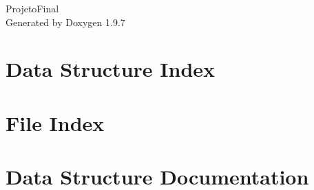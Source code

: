 \documentclass[twoside]{book}
\newcommand{\+}{\discretionary{\mbox{\scriptsize$\hookleftarrow$}}{}{}}
\newcommand{\clearemptydoublepage}{%
    \newpage{\pagestyle{empty}\cleardoublepage}%
  }
\begin{document}
  \raggedbottom
    \hypersetup{pageanchor=false,
                bookmarksnumbered=true,
                pdfencoding=unicode
               }
  \begin{titlepage}
  \vspace*{7cm}
  \begin{center}%
  {\Large Projeto\+Final}\\
  \vspace*{1cm}
  {\large Generated by Doxygen 1.9.7}\\
  \end{center}
  \end{titlepage}
  \clearemptydoublepage
  \tableofcontents
  \clearemptydoublepage
  \hypersetup{pageanchor=true}
\chapter{Data Structure Index}

\chapter{File Index}

\chapter{Data Structure Documentation}





\end{document}
